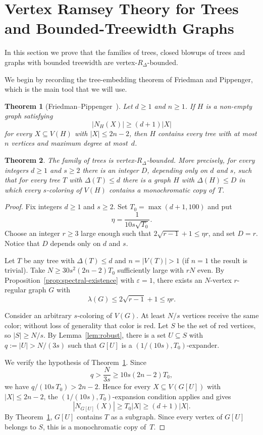 \documentclass[11pt]{article}
\newtheorem{theorem}{Theorem}
\theoremstyle{definition}
\newcommand{\eps}{\varepsilon}
\begin{document}
\section{Vertex Ramsey Theory for Trees and Bounded-Treewidth Graphs} \label{sec:treewidth}

In this section we prove that the families of trees, closed blowups of trees and graphs with bounded treewidth are vertex-$R_\Delta$-bounded.

We begin by recording the tree-embedding theorem of Friedman and
Pippenger, which is the main tool that we will use.

\begin{theorem}[Friedman--Pippenger~{\cite{FriedmanPippenger1987}}]
\label{thm:FP}
Let $d \ge 1$ and $n \ge 1$. If $H$ is a non-empty graph satisfying
\[
  |N_H(X)| \ge (d+1)|X|
\]
for every $X \subseteq V(H)$ with $|X| \le 2n-2$, then $H$ contains
every tree with at most $n$ vertices and maximum degree at most~$d$.
\end{theorem}

\begin{theorem}\label{thm:trees-vertex-ramsey}
The family of trees is vertex-$R_\Delta$-bounded. More precisely, for every integers $d \ge 1$ and $s\ge2$ there is an integer $D$, depending only on $d$ and $s$, such that for every tree $T$ with $\Delta(T) \le d$ there is a graph $H$ with $\Delta(H) \le D$ in which every $s$-coloring of $V(H)$ contains a monochromatic copy of~$T$.
\end{theorem}

\begin{proof}
Fix integers $d \ge 1$ and $s\ge2$. Set $T_0 = \max(d+1, 100)$ and put
\[
  \eta = \frac{1}{10s\sqrt{T_0}}.
\]
Choose an integer $r \ge 3$ large enough such that $2\sqrt{r-1}+1 \le \eta r$,
and set $D = r$. Notice that $D$ depends only on $d$ and $s$.

Let $T$ be any tree with $\Delta(T) \le d$ and $n = |V(T)|>1$ (if $n=1$ the result is trivial). Take $N \ge 30s^2(2n-2)T_0$ sufficiently large with $rN$ even. By Proposition~\ref{prop:spectral-existence} with $\eps = 1$, there exists an $N$-vertex $r$-regular graph $G$ with
\[
  \lambda(G) \le 2\sqrt{r-1}+1 \le \eta r.
\]

Consider an arbitrary $s$-coloring of $V(G)$. At least $N/s$ vertices receive the same color; without loss of generality that color is red. Let $S$ be the set of red vertices, so $|S| \ge N/s$. By Lemma~\ref{lem:robust}, there is a set $U \subseteq S$ with $q := |U| > N/(3s)$ such that $G[U]$ is a $(1/(10s), T_0)$-expander.

We verify the hypothesis of Theorem~\ref{thm:FP}. Since
\[
  q > \frac{N}{3s} \ge 10s(2n-2)T_0,
\]
we have $q/(10s\,T_0) > 2n-2$. Hence for every $X \subseteq V(G[U])$ with $|X| \le 2n-2$, the $(1/(10s),T_0)$-expansion condition applies and gives
\[
  |N_{G[U]}(X)| \ge T_0|X| \ge (d+1)|X|.
\]
By Theorem~\ref{thm:FP}, $G[U]$ contains $T$ as a subgraph. Since every
vertex of $G[U]$ belongs to $S$, this is a monochromatic copy of~$T$.
\end{proof}
\end{document}
